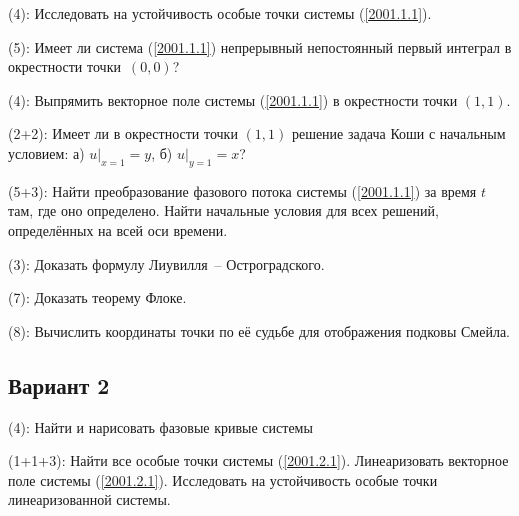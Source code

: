 \documentclass[a4paper]{article}
\newcommand{\skill}[1]{\textsf{(#1):}}
\begin{document}
\begin{problem}
\skill{4}
Исследовать на устойчивость особые точки системы (\ref{2001.1.1}).
\end{problem}

\begin{problem}
\skill{5}
Имеет ли система (\ref{2001.1.1}) непрерывный непостоянный первый интеграл в окрестности
точки~$(0,0)$?
\end{problem}

\begin{problem}
\skill{4} Выпрямить векторное поле системы (\ref{2001.1.1}) в окрестности точки $(1,1)$.
\end{problem}

\begin{problem}
\skill{2+2}
Имеет ли в окрестности точки $(1,1)$ решение задача Коши
с начальным условием: а) $u\rvert_{x=1}=y$, б) $u\rvert_{y=1} = x$?
\end{problem}

\begin{problem}
\skill{5+3} Найти преобразование фазового потока системы (\ref{2001.1.1}) за время $t$ там,
где оно определено. Найти начальные условия для всех решений, определённых на всей оси времени.
\end{problem}

\begin{problem}
\skill{3}
Доказать формулу Лиувилля~-- Остроградского.
\end{problem}

\begin{problem}
\skill{7}
Доказать теорему Флоке.
\end{problem}

\begin{problem}
\skill{8} Вычислить координаты точки по её судьбе для отображения подковы Смейла.
\end{problem}

\subsection{Вариант 2}

\begin{problem}
\skill{4}
Найти и нарисовать фазовые кривые системы
\end{problem}

\begin{problem}
\skill{1+1+3}
Найти все особые точки системы (\ref{2001.2.1}). Линеаризовать векторное поле системы (\ref{2001.2.1}).
Исследовать на устойчивость особые точки линеаризованной системы.
\end{problem}
\end{document}
